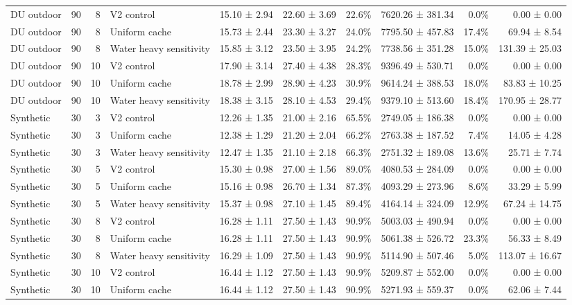 \documentclass[10pt,a4paper]{article}
\begin{document}
\begin{landscape}
\begin{longtable}{@{}llrlrrrrrr@{}}
DU outdoor & 90 & 8 & V2 control & 15.10 ± 2.94 & 22.60 ± 3.69 & 22.6\% & 7620.26 ± 381.34 & 0.0\% & 0.00 ± 0.00 \\
DU outdoor & 90 & 8 & Uniform cache & 15.73 ± 2.44 & 23.30 ± 3.27 & 24.0\% & 7795.50 ± 457.83 & 17.4\% & 69.94 ± 8.54 \\
DU outdoor & 90 & 8 & Water heavy sensitivity & 15.85 ± 3.12 & 23.50 ± 3.95 & 24.2\% & 7738.56 ± 351.28 & 15.0\% & 131.39 ± 25.03 \\
DU outdoor & 90 & 10 & V2 control & 17.90 ± 3.14 & 27.40 ± 4.38 & 28.3\% & 9396.49 ± 530.71 & 0.0\% & 0.00 ± 0.00 \\
DU outdoor & 90 & 10 & Uniform cache & 18.78 ± 2.99 & 28.90 ± 4.23 & 30.9\% & 9614.24 ± 388.53 & 18.0\% & 83.83 ± 10.25 \\
DU outdoor & 90 & 10 & Water heavy sensitivity & 18.38 ± 3.15 & 28.10 ± 4.53 & 29.4\% & 9379.10 ± 513.60 & 18.4\% & 170.95 ± 28.77 \\
Synthetic & 30 & 3 & V2 control & 12.26 ± 1.35 & 21.00 ± 2.16 & 65.5\% & 2749.05 ± 186.38 & 0.0\% & 0.00 ± 0.00 \\
Synthetic & 30 & 3 & Uniform cache & 12.38 ± 1.29 & 21.20 ± 2.04 & 66.2\% & 2763.38 ± 187.52 & 7.4\% & 14.05 ± 4.28 \\
Synthetic & 30 & 3 & Water heavy sensitivity & 12.47 ± 1.35 & 21.10 ± 2.18 & 66.3\% & 2751.32 ± 189.08 & 13.6\% & 25.71 ± 7.74 \\
Synthetic & 30 & 5 & V2 control & 15.30 ± 0.98 & 27.00 ± 1.56 & 89.0\% & 4080.53 ± 284.09 & 0.0\% & 0.00 ± 0.00 \\
Synthetic & 30 & 5 & Uniform cache & 15.16 ± 0.98 & 26.70 ± 1.34 & 87.3\% & 4093.29 ± 273.96 & 8.6\% & 33.29 ± 5.99 \\
Synthetic & 30 & 5 & Water heavy sensitivity & 15.37 ± 0.98 & 27.10 ± 1.45 & 89.4\% & 4164.14 ± 324.09 & 12.9\% & 67.24 ± 14.75 \\
Synthetic & 30 & 8 & V2 control & 16.28 ± 1.11 & 27.50 ± 1.43 & 90.9\% & 5003.03 ± 490.94 & 0.0\% & 0.00 ± 0.00 \\
Synthetic & 30 & 8 & Uniform cache & 16.28 ± 1.11 & 27.50 ± 1.43 & 90.9\% & 5061.38 ± 526.72 & 23.3\% & 56.33 ± 8.49 \\
Synthetic & 30 & 8 & Water heavy sensitivity & 16.29 ± 1.09 & 27.50 ± 1.43 & 90.9\% & 5114.90 ± 507.46 & 5.0\% & 113.07 ± 16.67 \\
Synthetic & 30 & 10 & V2 control & 16.44 ± 1.12 & 27.50 ± 1.43 & 90.9\% & 5209.87 ± 552.00 & 0.0\% & 0.00 ± 0.00 \\
Synthetic & 30 & 10 & Uniform cache & 16.44 ± 1.12 & 27.50 ± 1.43 & 90.9\% & 5271.93 ± 559.37 & 0.0\% & 62.06 ± 7.44 \\

\end{longtable}
\end{landscape}
\end{document}
